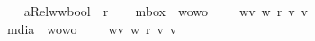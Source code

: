 \begin{isabellebody}
\ \ \isamarkupfalse%
\ aRel{\isacharcolon}{\isacharcolon}{\isachardoublequoteopen}w{\isasymRightarrow}w{\isasymRightarrow}bool{\isachardoublequoteclose}\ {\isacharparenleft}\ {\isachardoublequoteopen}r{\isachardoublequoteclose}{\isacharparenright}\isanewline
\ \ \isamarkupfalse%
\ mbox\ {\isacharcolon}{\isacharcolon}\ {\isachardoublequoteopen}wo{\isasymRightarrow}wo{\isachardoublequoteclose}\ {\isacharparenleft}{\isachardoublequoteopen}\isactrlbold {\isasymbox}{\isacharunderscore}{\isachardoublequoteclose}{\isacharparenright}\ \ {\isachardoublequoteopen}\isactrlbold {\isasymbox}{\isasymphi}\ {\isasymequiv}\ {\isasymlambda}w{\isachardot}{\isasymforall}v{\isachardot}\ {\isacharparenleft}w\ r\ v{\isacharparenright}{\isasymlongrightarrow}{\isacharparenleft}{\isasymphi}\ v{\isacharparenright}{\isachardoublequoteclose}\isanewline
{}\isamarkupfalse%
\ mdia\ {\isacharcolon}{\isacharcolon}\ {\isachardoublequoteopen}wo{\isasymRightarrow}wo{\isachardoublequoteclose}\ {\isacharparenleft}{\isachardoublequoteopen}\isactrlbold {\isasymdiamond}{\isacharunderscore}{\isachardoublequoteclose}{\isacharparenright}\ \ {\isachardoublequoteopen}\isactrlbold {\isasymdiamond}{\isasymphi}\ {\isasymequiv}\ {\isasymlambda}w{\isachardot}{\isasymexists}v{\isachardot}\ {\isacharparenleft}w\ r\ v{\isacharparenright}{\isasymand}{\isacharparenleft}{\isasymphi}\ v{\isacharparenright}{\isachardoublequoteclose}%


\end{isabellebody}
